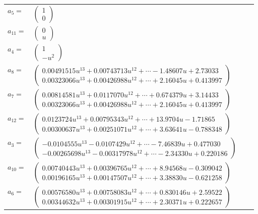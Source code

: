 \documentclass[1p]{elsarticle_modified}
\theoremstyle{definition}
\begin{document}
\begin{tabular}{m{7pt} m{180pt} m{7pt} m{180pt} }
\flushright $a_{5}=$&$\begin{pmatrix}1\\0\end{pmatrix}$ \\
\flushright $a_{11}=$&$\begin{pmatrix}0\\u\end{pmatrix}$ \\
\flushright $a_{4}=$&$\begin{pmatrix}1\\- u^2\end{pmatrix}$ \\
\flushright $a_{8}=$&$\begin{pmatrix}0.00491515 u^{13}+0.00743713 u^{12}+\cdots-1.48607 u+2.73033\\0.00323066 u^{13}+0.00426988 u^{12}+\cdots+2.16045 u+0.413997\end{pmatrix}$ \\
\flushright $a_{7}=$&$\begin{pmatrix}0.00814581 u^{13}+0.0117070 u^{12}+\cdots+0.674379 u+3.14433\\0.00323066 u^{13}+0.00426988 u^{12}+\cdots+2.16045 u+0.413997\end{pmatrix}$ \\
\flushright $a_{12}=$&$\begin{pmatrix}0.0123724 u^{13}+0.00795343 u^{12}+\cdots+13.9704 u-1.71865\\0.00300637 u^{13}+0.00251071 u^{12}+\cdots+3.63641 u-0.788348\end{pmatrix}$ \\
\flushright $a_{3}=$&$\begin{pmatrix}-0.0104555 u^{13}-0.0107429 u^{12}+\cdots-7.46839 u+0.477030\\-0.00265698 u^{13}-0.00317978 u^{12}+\cdots-2.34330 u+0.220186\end{pmatrix}$ \\
\flushright $a_{10}=$&$\begin{pmatrix}0.00740443 u^{13}+0.00396765 u^{12}+\cdots+8.94568 u-0.309042\\0.00196165 u^{13}+0.00147507 u^{12}+\cdots+3.38830 u-0.621258\end{pmatrix}$ \\
\flushright $a_{6}=$&$\begin{pmatrix}0.00576580 u^{13}+0.00758083 u^{12}+\cdots+0.830146 u+2.59522\\0.00344632 u^{13}+0.00301915 u^{12}+\cdots+2.30371 u+0.222657\end{pmatrix}$ \\

\end{tabular}
\end{document}
